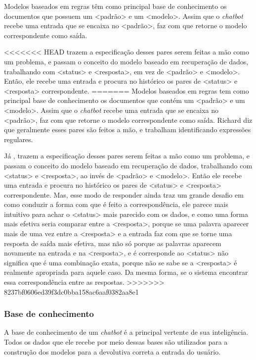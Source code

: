 \documentclass[
	12pt,				%
	oneside,
	a4paper,			%
	english,			%
	french,				%
	spanish,			%
	brazil				%
	]{abntex2}
\begin{document}
Modelos baseados em regras têm como principal base de conhecimento os documentos que possuem um <padrão> e um <modelo>. Assim que o \emph{chatbot} recebe uma entrada que se encaixa no <padrão>, faz com que retorne o modelo correspondente como saída.

<<<<<<< HEAD
\textcite{yan-etal-2016-docchat} trazem a especificação desses pares serem feitas a mão como um problema, e passam o conceito do modelo baseado em recuperação de dados, trabalhando com <status> e <resposta>, em vez de <padrão> e <modelo>. Então, ele recebe uma entrada e procura no histórico os pares de <status> e <resposta> correspondente. 
=======
Modelos baseados em regras tem como principal base de conhecimento os documentos que contém um <padrão> e um <modelo>. Assim que o \emph{chatbot} recebe uma entrada que se encaixa no <padrão>, faz com que retorne o modelo correspondente como saída. Richard diz que geralmente esses pares são feitos a mão, e trabalham identificando expressões regulares.

Já \textcite{yan-etal-2016-docchat}, trazem a especificação desses pares serem feitas a mão como um problema, e passam o conceito do modelo baseado em recuperação de dados, trabalhando com <status> e <resposta>, ao invés de <padrão> e <modelo>. Então ele recebe uma entrada e procura no histórico os pares de <status> e <resposta> correspondente. Mas, esse modo de responder ainda traz um grande desafio em como conduzir a forma com que é feito a correspondência, ele parece mais intuitivo para achar o <status> mais parecido com os dados, e como uma forma mais efetiva seria comparar entre a <resposta>, porque se uma palavra aparecer mais de uma vez entre a <resposta> e a entrada faz com que se torne uma resposta de saída mais efetiva, mas não só porque as palavras aparecem novamente na entrada e na <resposta>, e é corresponde ao <status> não significa que é uma combinação exata, porque não se sabe se a <resposta> é realmente apropriada para aquele caso. Da mesma forma, se o sistema encontrar essa correspondência entre as respostas.
>>>>>>> 8237bf0606ed39f3dc0bba158ac6aaf0382aa8e1

\subsubsection{Base de conhecimento}
A base de conhecimento de um \emph{chatbot} é a principal vertente de sua inteligência. Todos os dados que ele recebe por meio dessas bases são utilizados para a construção dos modelos para a devolutiva correta a entrada do usuário.
\end{document}
